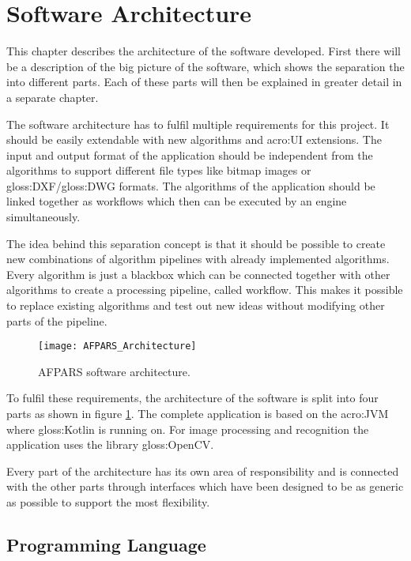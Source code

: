 \section{Software Architecture}
This chapter describes the architecture of the software developed. First there will be a description of the big picture of the software, which shows the separation the into different parts. Each of these parts will then be explained in greater detail in a separate chapter.

The software architecture has to fulfil multiple requirements for this project. It should be easily extendable with new algorithms and \acrshort{acro:UI} extensions. The input and output format of the application should be independent from the algorithms to support different file types like bitmap images or \gls{gloss:DXF}/\gls{gloss:DWG} formats. The algorithms of the application should be linked together as workflows which then can be executed by an engine simultaneously.

The idea behind this separation concept is that it should be possible to create new combinations of algorithm pipelines with already implemented algorithms. Every algorithm is just a blackbox which can be connected together with other algorithms to create a processing pipeline, called workflow. This makes it possible to replace existing algorithms and test out new ideas without modifying other parts of the pipeline. 

\begin{figure}[h]
  \centering
      \texttt{[image: AFPARS\_Architecture]}
  \caption{AFPARS software architecture.}
  \label{fig:AFPARS_Architecture}
\end{figure}


To fulfil these requirements, the architecture of the software is split into four parts as shown in figure \ref{fig:AFPARS_Architecture}. The complete application is based on the \acrfull{acro:JVM} where \gls{gloss:Kotlin} is running on. For image processing and recognition the application uses the library \gls{gloss:OpenCV}.

Every part of the architecture has its own area of responsibility and is connected with the other parts through interfaces which have been designed to be as generic as possible to support the most flexibility.

\subsection{Programming Language}

